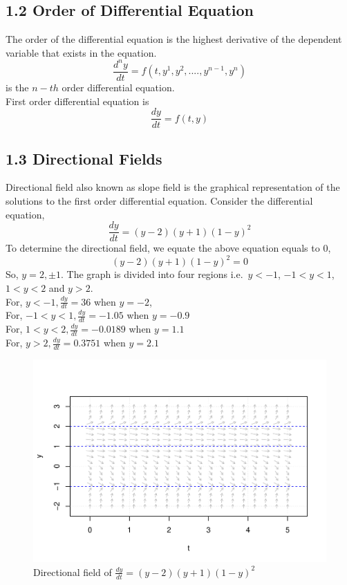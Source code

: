 \documentclass[
  11pt,
]{article}
\begin{document}
\subsection{1.2 Order of Differential
Equation}\label{order-of-differential-equation}

The order of the differential equation is the highest derivative of the
dependent variable that exists in the equation.
\[\frac{d^ny}{dt} = f(t, y^1, y^2,...., y^{n-1}, y^n)\] is the \(n-th\)
order differential equation.\\
First order differential equation is \[\frac{dy}{dt} = f(t, y)\]

\subsection{1.3 Directional Fields}\label{directional-fields}

Directional field also known as slope field is the graphical
representation of the solutions to the first order differential
equation. Consider the differential equation,
\[\frac{dy}{dt} = (y-2)(y+1)(1-y)^2\] To determine the directional
field, we equate the above equation equals to 0,
\[(y-2)(y+1)(1-y)^2 = 0\] So, \(y = 2, \pm1\). The graph is divided into
four regions i.e.~\(y <-1\), \(-1 < y < 1\), \(1 < y < 2\) and
\(y > 2\).\\
For, \(y < -1, \frac{dy}{dt} = 36\) when \(y = -2\),\\
For, \(-1 < y < 1, \frac{dy}{dt} = -1.05\) when \(y = -0.9\)\\
For, \(1 < y < 2, \frac{dy}{dt} = -0.0189\) when \(y = 1.1\)\\
For, \(y > 2, \frac{dy}{dt} = 0.3751\) when \(y = 2.1\)\\

\begin{figure}
\centering
\includegraphics{differential_files/figure-latex/difference2-1.pdf}
\caption{Directional field of \(\frac{dy}{dt}=(y-2)(y+1)(1-y)^2\)}
\end{figure}
\end{document}
